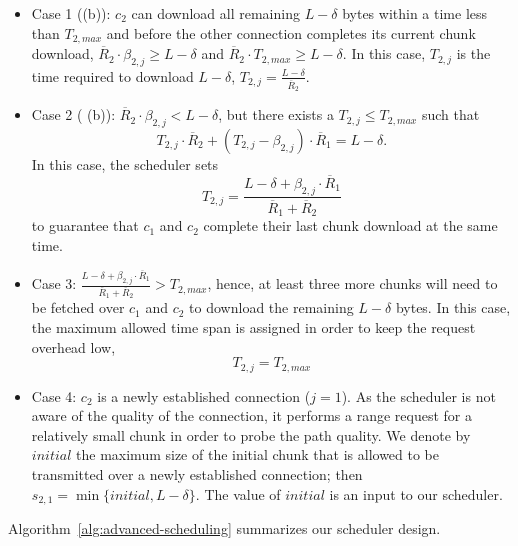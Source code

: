 \begin{itemize}
\item Case 1 ((b)): $c_2$ can download all remaining $L-\delta$ bytes  
within a time less than $T_{2,max}$ and before the other connection completes its current chunk download, 
\ie $\overline{R}_2 \cdot \beta_{2,j} \geq L-\delta$ and $ \overline{R}_2 \cdot T_{2,max} \geq L-\delta$. In this case, $T_{2,j}$ is the 
time required to download $L-\delta$, \ie $T_{2,j} = \frac{L-\delta}{\overline{R}_2}$.

\item Case 2 ( (b)): $\overline{R}_2 \cdot \beta_{2,j} < L-\delta$, but there exists a $T_{2,j} \leq T_{2,max}$ such that  
$$T_{2,j} \cdot \overline{R}_2 + (T_{2,j} - \beta_{2,j}) \cdot \overline{R}_1 = L-\delta.$$
In this case, the scheduler sets 
\begin{equation}
\label{eq:case2}
T_{2,j} = \frac{L-\delta + \beta_{2,j}\cdot \overline{R}_1}{\overline{R}_1 + \overline{R}_2}
\end{equation}
to guarantee that $c_1$ and $c_2$ complete their last chunk download at the same time.

\item Case 3: $\frac{L-\delta + \beta_{2,j}\cdot \overline{R}_1}{\overline{R}_1 + \overline{R}_2} > T_{2,max}$, 
hence, at least three more chunks will need to be fetched over $c_1$ and 
$c_2$ to download the remaining $L-\delta$ bytes. In this case, the maximum 
allowed time span is assigned in order to keep the request overhead low, \ie
$$T_{2,j} = T_{2,max}$$

\item Case 4: $c_2$ is a newly established connection ($j=1$). 
As the scheduler is not aware of the quality of the connection, it 
performs a range request for a relatively small chunk in order to probe the path quality. 
We denote by $initial$ the maximum size of the initial chunk that is allowed 
to be transmitted over a newly established connection; then $s_{2,1}=\min\{initial, L-\delta\}$. 
The value of $initial$ is an input to our scheduler. 
\end{itemize}
Algorithm~\ref{alg:advanced-scheduling} summarizes our scheduler design.


